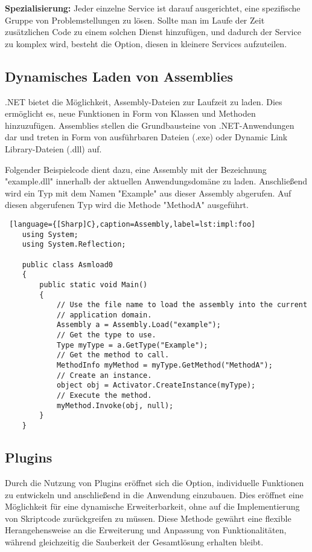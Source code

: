 \textbf{Spezialisierung:}
Jeder einzelne Service ist darauf ausgerichtet, eine spezifische Gruppe von 
Problemstellungen zu lösen. Sollte man im Laufe der Zeit zusätzlichen Code zu einem 
solchen Dienst hinzufügen, und dadurch der Service zu komplex wird, besteht die Option, 
diesen in kleinere Services aufzuteilen.

\cite{microservices}

\newpage
\subsection*{Dynamisches Laden von Assemblies}

.NET bietet die Möglichkeit, Assembly-Dateien zur Laufzeit zu laden. 
Dies ermöglicht es, neue Funktionen in Form von Klassen und Methoden hinzuzufügen. 
Assemblies stellen die Grundbausteine von .NET-Anwendungen dar und treten in Form 
von ausführbaren Dateien (.exe) oder Dynamic Link Library-Dateien (.dll) auf. \cite{assemblies}

Folgender Beispielcode dient dazu, eine Assembly mit der Bezeichnung "example.dll" innerhalb 
der aktuellen Anwendungsdomäne zu laden. Anschließend wird ein Typ mit dem Namen "Example" 
aus dieser Assembly abgerufen. Auf diesen abgerufenen Typ wird die Methode "MethodA" ausgeführt.
\cite{assemblies}

\begin{lstlisting} [language={[Sharp]C},caption=Assembly,label=lst:impl:foo]
    using System;
    using System.Reflection;
    
    public class Asmload0
    {
        public static void Main()
        {
            // Use the file name to load the assembly into the current
            // application domain.
            Assembly a = Assembly.Load("example");
            // Get the type to use.
            Type myType = a.GetType("Example");
            // Get the method to call.
            MethodInfo myMethod = myType.GetMethod("MethodA");
            // Create an instance.
            object obj = Activator.CreateInstance(myType);
            // Execute the method.
            myMethod.Invoke(obj, null);
        }
    }
\end{lstlisting}
\cite{assemblies}

\newpage
\subsection*{Plugins}

Durch die Nutzung von Plugins eröffnet sich die Option, individuelle Funktionen 
zu entwickeln und anschließend in die Anwendung einzubauen. 
Dies eröffnet eine Möglichkeit für eine dynamische Erweiterbarkeit, ohne auf die Implementierung 
von Skriptcode zurückgreifen zu müssen. Diese Methode gewährt eine flexible 
Herangehensweise an die Erweiterung und Anpassung von Funktionalitäten, während 
gleichzeitig die Sauberkeit der Gesamtlösung erhalten bleibt. \cite{pluginframework}

